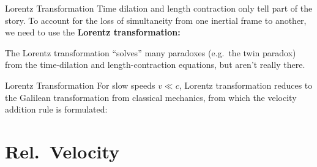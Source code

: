 \documentclass[12pt,compress,aspectratio=169]{beamer}
\begin{document}
\begin{frame}{Lorentz Transformation}
  Time dilation and length contraction only tell part of the story. To account
  for the loss of simultaneity from one inertial frame to another, we need to
  use the \textbf{Lorentz transformation:}

  
  \vspace{-.1in}The Lorentz transformation ``solves'' many paradoxes
  (e.g.\ the twin paradox) from the time-dilation and
  length-contraction equations, but aren't really there.
\end{frame}

\begin{frame}{Lorentz Transformation}
  For slow speeds $v\ll c$, Lorentz transformation reduces to the Galilean
  transformation from classical mechanics, from which the velocity addition
  rule is formulated:

  \vspace{-.45in}{\Large
    \begin{align*}
      x' &= x-vt\\
      y' &= y\\
      z' &= z\\
      t' &= t'
    \end{align*}
  }
\end{frame}



\section{Rel.\ Velocity}
\end{document}
